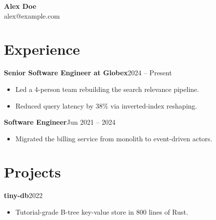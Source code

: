 \documentclass[letterpaper,10pt]{article}
\begin{document}
{\Large \textbf{Alex Doe}} \\
alex@example.com

\section{Experience}

\textbf{Senior Software Engineer at Globex}\hfill 2024 -- Present \\
\begin{itemize}
  \item Led a 4-person team rebuilding the search relevance pipeline.
  \item Reduced query latency by 38\% via inverted-index reshaping.
\end{itemize}

\textbf{Software Engineer}\hfill Jun 2021 -- 2024 \\
\begin{itemize}
  \item Migrated the billing service from monolith to event-driven actors.
\end{itemize}

\section{Projects}

\textbf{tiny-db}\hfill 2022 \\
\begin{itemize}
  \item Tutorial-grade B-tree key-value store in 800 lines of Rust.
\end{itemize}
\end{document}
